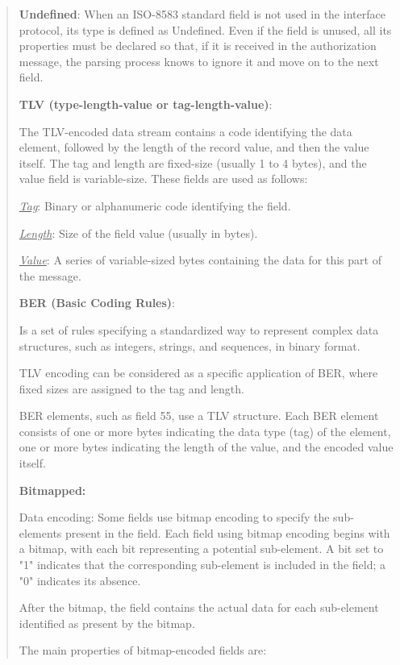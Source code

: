 \documentclass[12pt,a4paper]{report}
\begin{document}
\begin{quote}
\textbf{Undefined}: When an ISO-8583 standard field is not used in the
interface protocol, its type is defined as Undefined. Even if the field
is unused, all its properties must be declared so that, if it is
received in the authorization message, the parsing process knows to
ignore it and move on to the next field.

\textbf{TLV (type-length-value or tag-length-value)}:

The TLV-encoded data stream contains a code identifying the data
element, followed by the length of the record value, and then the value
itself. The tag and length are fixed-size (usually 1 to 4 bytes), and
the value field is variable-size. These fields are used as follows:

\emph{\uline{Tag}}: Binary or alphanumeric code identifying the field.

\emph{\uline{Length}}: Size of the field value (usually in bytes).

\emph{\uline{Value}}: A series of variable-sized bytes containing the
data for this part of the message.

\textbf{BER (Basic Coding Rules)}:

Is a set of rules specifying a standardized way to represent complex
data structures, such as integers, strings, and sequences, in binary
format.

TLV encoding can be considered as a specific application of BER, where
fixed sizes are assigned to the tag and length.

BER elements, such as field 55, use a TLV structure. Each BER element
consists of one or more bytes indicating the data type (tag) of the
element, one or more bytes indicating the length of the value, and the
encoded value itself.

\textbf{Bitmapped:}

Data encoding: Some fields use bitmap encoding to specify the
sub-elements present in the field. Each field using bitmap encoding
begins with a bitmap, with each bit representing a potential
sub-element. A bit set to "1" indicates that the corresponding
sub-element is included in the field; a "0" indicates its absence.

After the bitmap, the field contains the actual data for each
sub-element identified as present by the bitmap.

The main properties of bitmap-encoded fields are:
\end{quote}
\end{document}
